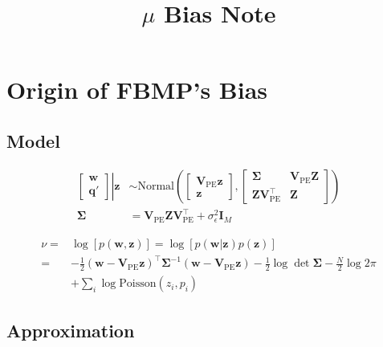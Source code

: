 \documentclass[notitlepage]{article}
\title{$\mu$ Bias Note}
\date{}
\begin{document}
\newcommand{\ud}{\mathrm{d}}

\maketitle
\tableofcontents

\section{Origin of FBMP's Bias}

\subsection{Model}

\begin{equation}
\begin{aligned}
    \left.
    \begin{bmatrix}
        \bm{w} \\
        \bm{q}'
    \end{bmatrix}
    \right\vert\bm{z}
    &\sim \mathrm{Normal}\left(
    \begin{bmatrix}
        \bm{V}_\mathrm{PE}\bm{z} \\
        \bm{z}
    \end{bmatrix}, 
    \begin{bmatrix}
        \bm{\Sigma} & \bm{V}_\mathrm{PE}\bm{Z} \\
        \bm{Z}\bm{V}_\mathrm{PE}^\intercal & \bm{Z}
    \end{bmatrix}
    \right) \\
    \bm{\Sigma} &= \bm{V}_\mathrm{PE}\bm{Z}\bm{V}_\mathrm{PE}^\intercal+\sigma_\epsilon^2\bm{I}_M 
\end{aligned}
\end{equation}

\begin{equation}
\begin{aligned}
    \nu =& \log[p(\bm{w},\bm{z})] = \log[p(\bm{w}|\bm{z})p(\bm{z})] \\
    =& -\frac{1}{2}(\bm{w}-\bm{V}_\mathrm{PE}\bm{z})^\intercal\bm{\Sigma}^{-1}(\bm{w}-\bm{V}_\mathrm{PE}\bm{z})-\frac{1}{2}\log\det\bm{\Sigma}-\frac{N}{2}\log2\pi \\
    &+ \sum_{i}\log{\mathrm{Poisson}(z_i,p_i)}
\end{aligned}
\end{equation}

\subsection{Approximation}
\end{document}
